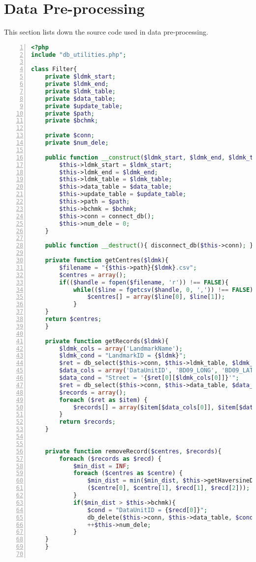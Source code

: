 \clearpage
\newpage

\section{Data Pre-processing}
This section lists down the source code used in data pre-processing. 

\begin{lstlisting}[language = PHP, caption = {Outlier Removal}, label = {AList:outlier_rmvl}, frame=single, numbers=left, stepnumber=1]
<?php
include "db_utilities.php";

class Filter{
    private $ldmk_start;
    private $ldmk_end;
    private $ldmk_table;
    private $data_table;
    private $update_table;
    private $path;
    private $bchmk;
    
    private $conn;
    private $num_dele;
    
    public function __construct($ldmk_start, $ldmk_end, $ldmk_table, $data_table, $path, $bchmk, $update_table){
        $this->ldmk_start = $ldmk_start;
        $this->ldmk_end = $ldmk_end;
        $this->ldmk_table = $ldmk_table;
        $this->data_table = $data_table;
        $this->update_table = $update_table;
        $this->path = $path;
        $this->bchmk = $bchmk;
        $this->conn = connect_db();
        $this->num_dele = 0;
    }
    
    public function __destruct(){ disconnect_db($this->conn); }
    
    private function getCentres($ldmk){
        $filename = "{$this->path}{$ldmk}.csv";
        $centres = array();
        if(($handle = fopen($filename, 'r')) !== FALSE){
            while(($line = fgetcsv($handle, 0, ',')) !== FALSE){
                $centres[] = array($line[0], $line[1]);
            }
	}
	return $centres;
    }
    
    private function getRecords($ldmk){
        $ldmk_cols = array('LandmarkName');
        $ldmk_cond = "LandmarkID = {$ldmk}";
        $ret = db_select($this->conn, $this->ldmk_table, $ldmk_cols, $ldmk_cond);
        $data_cols = array('DataUnitID', 'BD09_LONG', 'BD09_LAT');
        $data_cond = "Street = '{$ret[0][$ldmk_cols[0]]}'";
        $ret = db_select($this->conn, $this->data_table, $data_cols, $data_cond);
        $records = array();
        foreach ($ret as $item) {
            $records[] = array($item[$data_cols[0]], $item[$data_cols[1]], $item[$data_cols[2]]);
        }
        return $records;
    }
    
    
    private function removeRecord($centres, $records){
        foreach ($records as $recd) {
            $min_dist = INF;
            foreach ($centres as $centre) {
                $min_dist = min($min_dist, $this->getHaversineDist
                ($centre[0], $centre[1], $recd[1], $recd[2]));
            }
            if($min_dist > $this->bchmk){
                $cond = "DataUnitID = {$recd[0]}";
                db_delete($this->conn, $this->data_table, $cond);
                ++$this->num_dele;
            }
	}
    }
    

\end{lstlisting}
